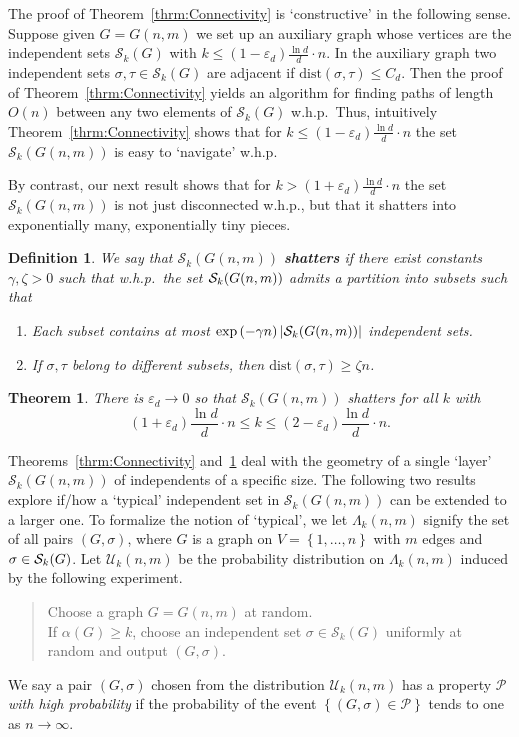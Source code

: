 \documentclass[a4paper,10pt]{article}
\newtheorem{definition}{Definition}\renewcommand{\thedefinition}{\arabic{definition}}
\newtheorem{theorem}{Theorem}\renewcommand{\thetheorem}{\arabic{theorem}}
\newcommand\dist{\mathrm{dist}}
\newcommand\cU{\mathcal{U}}
\newcommand\cS{\mathcal{S}}
\newcommand\cP{\mathcal{P}}
\newcommand\eps{\varepsilon}
\newcommand\ra{\rightarrow}
\newcommand\bc[1]{\left({#1}\right)}
\newcommand\cbc[1]{\left\{{#1}\right\}}
\newcommand\abs[1]{\left|{#1}\right|}
\newcommand{\whp}{w.h.p.}
\newcommand\Thm{Theorem}
\begin{document}
\noindent
The proof of \Thm~\ref{thrm:Connectivity} is `constructive' in the
following sense. Suppose given $G=G(n,m)$ we set up an auxiliary
graph whose vertices are the independent sets $\cS_k(G)$ with
$k\leq (1-\eps_d)\frac{\ln d}d\cdot n$. In the auxiliary graph
two independent sets $\sigma,\tau\in\cS_k(G)$ are adjacent if
$\dist(\sigma,\tau)\leq C_d$. Then the proof of \Thm~\ref{thrm:Connectivity}
yields an algorithm  for finding paths of length $O(n)$ between
any two elements of $\cS_k(G)$ \whp\ Thus, intuitively \Thm~\ref{thrm:Connectivity}
shows that for $k\leq(1-\eps_d)\frac{\ln d}d\cdot n$ the set
$\cS_k(G(n,m))$ is easy to `navigate' \whp



By contrast, our next result shows that for $k>(1+\eps_d)\frac{\ln d}d\cdot n$
the set $\cS_k(G(n,m))$ is not just disconnected \whp, but that
it shatters into exponentially many, exponentially tiny pieces.


\begin{definition}\label{Def_shattering}
We say that $\cS_k(G(n,m))$ {\bf shatters} if there exist constants
$ \gamma , \zeta>0$ such that \whp\ the set ${\cal S}_k(G(n,m))$ admits a
partition into subsets such that
\begin{enumerate}
\item Each subset contains at most $\exp\bc{-\gamma n}\abs{{\cal S}_k(G(n,m))}$
		independent sets.
\item If $\sigma,\tau$ belong to different subsets, then
	$\dist(\sigma,\tau)\geq\zeta n$.
\end{enumerate}
\end{definition}


\begin{theorem}\label{theorem:shattering}
There is $\eps_d\ra0$ so that $\cS_k(G(n,m))$ shatters for all
$k$ with
\begin{displaymath}
(1+\eps_d)\frac{\ln d}d\cdot n\leq k\leq(2-\eps_d)\frac{\ln d}d\cdot n.
\end{displaymath}
\end{theorem}

\noindent
\Thm s~\ref{thrm:Connectivity} and~\ref{theorem:shattering} deal
with the geometry of a single `layer' $\cS_k(G(n,m))$ of independents
of a specific size. The following two results explore if/how a 
`typical' independent set in $\cS_k(G(n,m))$ can be extended 
to a larger one. To formalize the notion of `typical', we let
$\Lambda_k(n,m)$ signify the set of all pairs $(G,\sigma)$, where
$G$ is a graph on $V=\cbc{1,\ldots,n}$ with $m$ edges and
$\sigma\in {\cal S}_k(G)$. Let $\cU_k(n,m)$ be the probability
distribution on $\Lambda_k(n,m)$  induced  by the following 
experiment.
\begin{quote}
Choose a graph $G=G(n,m)$ at random.\\
If $\alpha(G)\geq k$,
choose an independent set $\sigma\in\cS_k(G)$ uniformly at random
and output $(G,\sigma)$.
\end{quote}
We say a pair $(G,\sigma)$ chosen from the distribution $\cU_k(n,m)$
has a property $\cP$ \emph{with high probability} if the probability
of the event $\cbc{(G,\sigma)\in\cP}$ tends to one as $n\ra\infty$.
\end{document}
